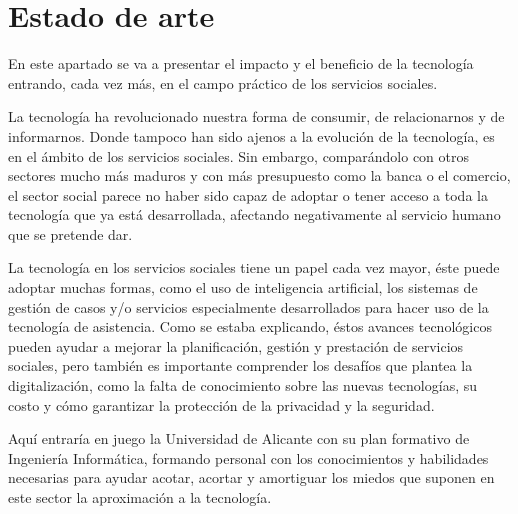 
\chapter{Estado de arte}
En este apartado se va a presentar el impacto y el beneficio de la tecnología entrando, cada vez más, en el campo práctico de los servicios sociales.
\vspace{1em}
\par La tecnología ha revolucionado nuestra forma de consumir, de relacionarnos y de informarnos. Donde tampoco han sido ajenos a la evolución de la tecnología, es en el ámbito de los servicios sociales. Sin embargo, comparándolo con otros sectores mucho más maduros y con más presupuesto como la banca o el comercio, el sector social parece no haber sido capaz de adoptar o tener acceso a toda la tecnología que ya está desarrollada, afectando negativamente al servicio humano que se pretende dar.
\vspace{1em}
\par La tecnología en los servicios sociales tiene un papel cada vez mayor, éste puede adoptar muchas formas, como el uso de inteligencia artificial, los sistemas de gestión de casos y/o servicios especialmente desarrollados para hacer uso de la tecnología de asistencia. Como se estaba explicando, éstos avances tecnológicos pueden ayudar a mejorar la planificación, gestión y prestación de servicios sociales, pero también es importante comprender los desafíos que plantea la digitalización, como la falta de conocimiento sobre las nuevas tecnologías, su costo y cómo garantizar la protección de la privacidad y la seguridad.
\vspace{1em}
\par Aquí entraría en juego la Universidad de Alicante con su plan formativo de Ingeniería Informática, formando personal con los conocimientos y habilidades necesarias para ayudar acotar, acortar y amortiguar los miedos que suponen en este sector la aproximación a la tecnología.
\clearpage
